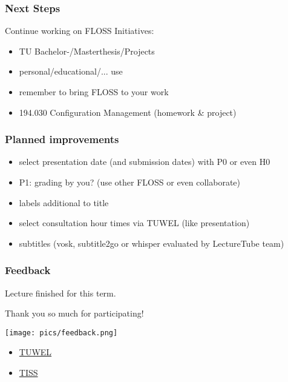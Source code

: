 \begin{frame}
	\frametitle{Next Steps}

	Continue working on FLOSS Initiatives:

	\begin{itemize}[<+-| alert@+>]
	\item TU Bachelor-/Masterthesis/Projects
	\item personal/educational/... use
	\item remember to bring FLOSS to your work
	\item 194.030 Configuration Management (homework \& project)
	\end{itemize}
\end{frame}

\begin{frame}
	\frametitle{Planned improvements}

	\begin{itemize}[<+-| alert@+>]
		\item select presentation date (and submission dates) with P0 or even H0
		\item P1: grading by you? (use other FLOSS or even collaborate)
		\item labels additional to title
		\item select consultation hour times via TUWEL (like presentation)
		\item subtitles (vosk, subtitle2go or whisper evaluated by LectureTube team)
	\end{itemize}
\end{frame}

\begin{frame}
	\frametitle{Feedback}
	Lecture finished for this term.

	Thank you so much for participating!

	\hfill \texttt{[image: pics/feedback.png]}
	\vspace{-1cm}
	\begin{itemize}
		\item \href{https://tuwel.tuwien.ac.at/mod/feedback/view.php?id=1661074}{TUWEL}
		\item \href{https://tiss.tuwien.ac.at/survey/surveyForm.xhtml?courseNumber=194114&semesterCode=2022W}{TISS}
	\end{itemize}
\end{frame}

\appendix

\begin{frame}[allowframebreaks]
	
	
\end{frame}



